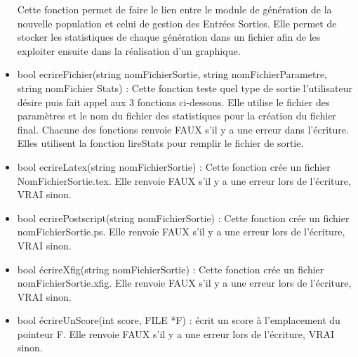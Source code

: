 \documentclass[a4paper,11pt]{article}
\begin{document}
\begin{itemize}
					Cette fonction permet de faire le lien entre le module de génération de la nouvelle population et celui de gestion des Entrées Sorties. 
					Elle permet de stocker les statistiques de chaque génération dans un fichier afin de les exploiter ensuite dans la réalisation d’un graphique.\vspace{0.2cm}
				\item bool ecrireFichier(string nomFichierSortie, string nomFichierParametre, string nomFichier Stats) : Cette fonction teste quel type de sortie l’utilisateur désire puis fait appel aux 3 fonctions ci-dessous. 
					Elle utilise le fichier des paramètres et le nom du fichier des statistiques pour la création du fichier final. 
					Chacune des fonctions renvoie FAUX s’il y a une erreur dans l’écriture. Elles utilisent la fonction lireStats pour remplir le fichier de sortie.\vspace{0.2cm}
				\item bool ecrireLatex(string nomFichierSortie) : Cette fonction crée un fichier NomFichierSortie.tex.
					Elle renvoie FAUX s’il y a une erreur lors de l’écriture, VRAI sinon.\vspace{0.2cm}
				\item bool ecrirePostscript(string nomFichierSortie)  : Cette fonction crée un fichier nomFichierSortie.ps.
					Elle renvoie FAUX s’il y a une erreur lors de l’écriture, VRAI sinon.\vspace{0.2cm}
				\item bool écrireXfig(string nomFichierSortie)  : Cette fonction crée un fichier nomFichierSortie.xfig.
					Elle renvoie FAUX s’il y a une erreur lors de l’écriture, VRAI sinon.\vspace{0.2cm}
				\item bool écrireUnScore(int score, FILE *F) : écrit un score à l’emplacement du pointeur F.
					Elle renvoie FAUX s’il y a une erreur lors de l’écriture, VRAI sinon. \\
			\end{itemize}
		
\end{document}
